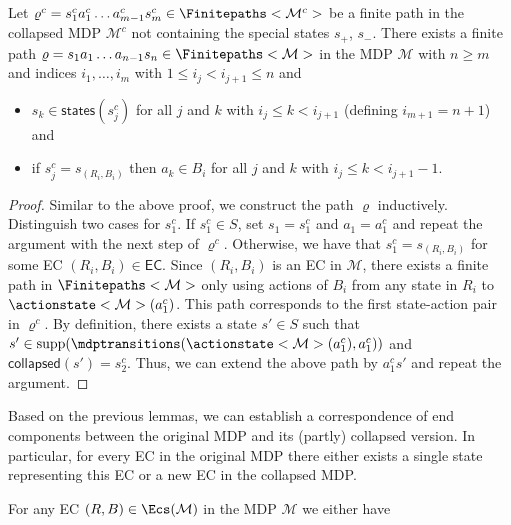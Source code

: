 \documentclass{theoretics}
\newcommand{\intersectionSym}{\cap}
\newcommand{\intersectionBin}{\mathbin{\intersectionSym}}
\newcommand{\intersection}{\intersectionBin}
\newcommand{\MDP}{\mathcal{M}}
\newcommand{\States}{S}
\newcommand{\Actions}{Act}
\newcommand{\finitepath}{\varrho}
\DeclareMathOperator{\support}{supp}
\newcommand{\targetstate}{s_+}
\newcommand{\sinkstate}{s_-}
\newcommand{\eccollapsed}{\mathsf{collapsed}}
\newcommand{\ecstates}{\mathsf{states}}
\newcommand{\algoecs}{\mathsf{EC}}
\begin{document}
\begin{lemma} \label{stm:collapse:path_collapsed_to_normal}
	Let $\finitepath^c = s^c_1 a^c_1 \dots a^c_{m-1} s^c_m \in \Finitepaths<\MDP^c>$ be a finite path in the collapsed MDP $\MDP^c$ not containing the special states $\targetstate$, $\sinkstate$.
	There exists a finite path $\finitepath = s_1 a_1 \dots a_{n-1} s_n \in \Finitepaths<\MDP>$ in the MDP $\MDP$ with $n \geq m$ and indices $i_1, \dots, i_m$ with $1 \leq i_j < i_{j+1} \leq n$ and
	\begin{itemize}
		\item $s_k \in \ecstates(s^c_j)$ for all $j$ and $k$ with $i_j \leq k < i_{j+1}$ (defining $i_{m+1} = n + 1$) and
		\item if $s^c_j = s_{(R_i, B_i)}$ then $a_k \in B_i$ for all $j$ and $k$ with $i_j \leq k < i_{j+1} - 1$.
	\end{itemize}
\end{lemma}
\begin{proof}
	Similar to the above proof, we construct the path $\finitepath$ inductively.
	Distinguish two cases for $s^c_1$.
	If $s^c_1 \in \States$, set $s_1 = s^c_1$ and $a_1 = a^c_1$ and repeat the argument with the next step of $\finitepath^c$.
	Otherwise, we have that $s^c_1 = s_{(R_i, B_i)}$ for some EC $(R_i, B_i) \in \algoecs$.
	Since $(R_i, B_i)$ is an EC in $\MDP$, there exists a finite path in $\Finitepaths<\MDP>$ only using actions of $B_i$ from any state in $R_i$ to $\actionstate<\MDP>(a^c_1)$.
	This path corresponds to the first state-action pair in $\finitepath^c$.
	By definition, there exists a state $s' \in \States$ such that $s' \in \support(\mdptransitions(\actionstate<\MDP>(a^c_1), a^c_1))$ and $\eccollapsed(s') = s^c_2$.
	Thus, we can extend the above path by $a^c_1 s'$ and repeat the argument. 
\end{proof}
Based on the previous lemmas, we can establish a correspondence of end components between the original MDP and its (partly) collapsed version.
In particular, for every EC in the original MDP there either exists a single state representing this EC or a new EC in the collapsed MDP.
\begin{lemma} \label{stm:collapse:ec_correspondence_normal_to_collapse}
	For any EC $(R, B) \in \Ecs(\MDP)$ in the MDP $\MDP$ we either have
\end{lemma}
\end{document}
